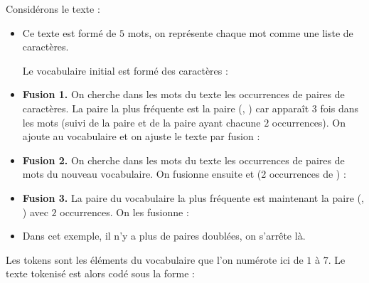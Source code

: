 \documentclass[11pt,class=report,crop=false]{standalone}
\begin{document}
\begin{exemple}
Considérons le texte : 
\begin{itemize}
	\item Ce texte est formé de $5$ mots, on représente chaque mot comme une liste de caractères.
	

Le vocabulaire initial est formé des caractères :

\item \textbf{Fusion 1.}
On cherche dans les mots du texte les occurrences de paires de caractères.
La paire la plus fréquente est la paire (, ) car  apparaît $3$ fois dans les mots (suivi de la paire  et de la paire  ayant chacune $2$ occurrences).
On ajoute  au vocabulaire et on ajuste le texte par fusion :



\item  \textbf{Fusion 2.}
On cherche dans les mots du texte les occurrences de paires de mots du nouveau vocabulaire. On fusionne ensuite  et  
(2 occurrences de ) :



\item  \textbf{Fusion 3.}
La paire du vocabulaire la plus fréquente est maintenant la paire
(, ) avec $2$ occurrences. On les fusionne :



\item Dans cet exemple, il n'y a plus de paires doublées, on s'arrête là.

\end{itemize}

Les tokens sont les éléments du vocabulaire que l'on numérote ici de $1$ à $7$.
Le texte tokenisé est alors codé sous la forme :

\end{exemple}
\end{document}
